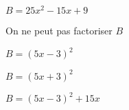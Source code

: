 \begin{QCM}
\begin{GroupeQCM}
    
     \begin{exercice}
      $B=25x^2-15x+9$
      \begin{ChoixQCM}{4}
      \item On ne peut pas factoriser $B$
      \item $B=(5x-3)^2$
      \item $B=(5x+3)^2$
      \item $B=(5x-3)^2+15x$
      \end{ChoixQCM}
      \begin{corrige}
   \end{corrige}
    \end{exercice}
 \end{GroupeQCM}  
\end{QCM}  
    

    
   

  
